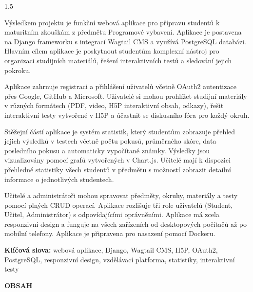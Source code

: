 \documentclass[a4paper,12pt]{article}
\begin{document}
\begin{spacing}{1.5}
\fontsize{12}{16}\selectfont

Výsledkem projektu je funkční webová aplikace pro přípravu studentů k maturitním zkouškám z předmětu Programové vybavení. Aplikace je postavena na Django frameworku s integrací Wagtail CMS a využívá PostgreSQL databázi. Hlavním cílem aplikace je poskytnout studentům komplexní nástroj pro organizaci studijních materiálů, řešení interaktivních testů a sledování jejich pokroku.

\vspace{0.4cm}

Aplikace zahrnuje registraci a přihlášení uživatelů včetně OAuth2 autentizace přes Google, GitHub a Microsoft. Uživatelé si mohou prohlížet studijní materiály v různých formátech (PDF, video, H5P interaktivní obsah, odkazy), řešit interaktivní testy vytvořené v H5P a účastnit se diskusního fóra pro každý okruh.

\vspace{0.4cm}

Stěžejní částí aplikace je systém statistik, který studentům zobrazuje přehled jejich výsledků v testech včetně počtu pokusů, průměrného skóre, data posledního pokusu a automaticky vypočítané známky. Výsledky jsou vizualizovány pomocí grafů vytvořených v Chart.js. Učitelé mají k dispozici přehledné statistiky všech studentů v předmětu s možností zobrazit detailní informace o jednotlivých studentech.

\vspace{0.4cm}

Učitelé a administrátoři mohou spravovat předměty, okruhy, materiály a testy pomocí plných CRUD operací. Aplikace rozlišuje tři role uživatelů (Student, Učitel, Administrátor) s odpovídajícími oprávněními. Aplikace má zcela responzivní design a funguje na všech zařízeních od desktopových počítačů až po mobilní telefony. Aplikace je připravena pro nasazení pomocí Dockeru.

\end{spacing}

\vspace{0.5cm}

\textbf{Klíčová slova:} webová aplikace, Django, Wagtail CMS, H5P, OAuth2, PostgreSQL, responzivní design, vzdělávací platforma, statistiky, interaktivní testy

\newpage

\thispagestyle{empty}

{\fontsize{18}{22}\selectfont\textbf{OBSAH}}
\end{document}
